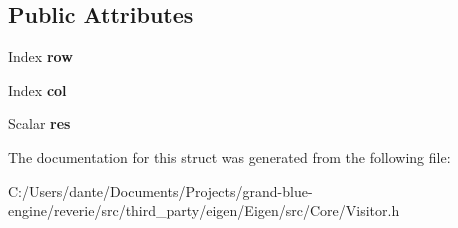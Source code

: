 \subsection*{Public Attributes}
\begin{DoxyCompactItemize}
\item 
\mbox{\label{struct_eigen_1_1internal_1_1coeff__visitor_aaec19026273c975a85b1d539d4b7dbab}} 
Index {\bfseries row}
\item 
\mbox{\label{struct_eigen_1_1internal_1_1coeff__visitor_a9ce5b71bd59199535b78b1db63fd3801}} 
Index {\bfseries col}
\item 
\mbox{\label{struct_eigen_1_1internal_1_1coeff__visitor_a997d67dffc3b7f525c5c43d6b8b61177}} 
Scalar {\bfseries res}
\end{DoxyCompactItemize}


The documentation for this struct was generated from the following file\+:\begin{DoxyCompactItemize}
\item 
C\+:/\+Users/dante/\+Documents/\+Projects/grand-\/blue-\/engine/reverie/src/third\+\_\+party/eigen/\+Eigen/src/\+Core/Visitor.\+h\end{DoxyCompactItemize}
